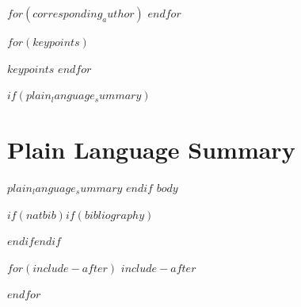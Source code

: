 \documentclass[$for(classoption)$$classoption$$sep$,$endfor$]{agujournal2019}
\begin{document}
$for(corresponding_author)$
$endfor$




\begin{keypoints}
$for(keypoints)$
\item $keypoints$
$endfor$
\end{keypoints}

%
%


\begin{abstract}
$abstract$
\end{abstract}
$if(plain_language_summary)$
\section*{Plain Language Summary}
$plain_language_summary$
$endif$
$body$

$if(natbib)$$if(bibliography)$

$endif$$endif$

$for(include-after)$
$include-after$

$endfor$
\end{document}
